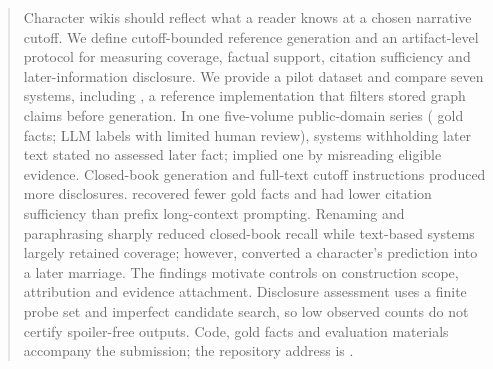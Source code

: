 \begin{abstract}
Character wikis should reflect what a reader knows at a chosen narrative cutoff.
We define cutoff-bounded reference generation and an artifact-level protocol for measuring
coverage, factual support, citation sufficiency and later-information disclosure.
We provide a pilot dataset and compare seven systems, including \sys, a reference
implementation that filters stored graph claims before generation. In one five-volume public-domain series
( gold facts; LLM labels\ifnwhuman{} with limited human review\fi{}),
systems withholding later text stated no assessed later fact; \sys implied one by misreading
eligible evidence. Closed-book generation and full-text cutoff instructions produced more
disclosures. \sys recovered fewer gold facts and had lower citation sufficiency than prefix
long-context prompting.\ifnwdecon{} Renaming and paraphrasing sharply reduced closed-book
recall while text-based systems largely retained coverage; however, \sys converted a
character's prediction into a later marriage.\fi{} The findings motivate controls on
construction scope, attribution and evidence attachment. Disclosure assessment uses a
finite probe set and imperfect candidate search,
so low observed counts do not certify spoiler-free outputs. Code, gold facts and evaluation
materials accompany the submission; the repository address is \anonrepo.
\end{abstract}
